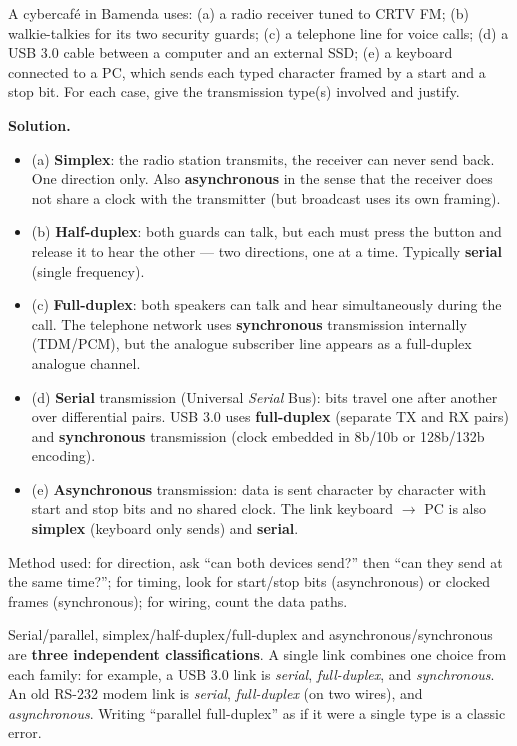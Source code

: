 \documentclass[11pt]{article}
\begin{document}
\begin{exoresolu}
A cybercaf\'e in Bamenda uses: (a) a radio receiver tuned to CRTV FM; (b) walkie-talkies for its two security guards; (c) a telephone line for voice calls; (d) a USB 3.0 cable between a computer and an external SSD; (e) a keyboard connected to a PC, which sends each typed character framed by a start and a stop bit. For each case, give the transmission type(s) involved and justify.

\tcblower
\textbf{Solution.}
\begin{itemize}
\item (a) \textbf{Simplex}: the radio station transmits, the receiver can never send back. One direction only. Also \textbf{asynchronous} in the sense that the receiver does not share a clock with the transmitter (but broadcast uses its own framing).
\item (b) \textbf{Half-duplex}: both guards can talk, but each must press the button and release it to hear the other --- two directions, one at a time. Typically \textbf{serial} (single frequency).
\item (c) \textbf{Full-duplex}: both speakers can talk and hear simultaneously during the call. The telephone network uses \textbf{synchronous} transmission internally (TDM/PCM), but the analogue subscriber line appears as a full-duplex analogue channel.
\item (d) \textbf{Serial} transmission (Universal \emph{Serial} Bus): bits travel one after another over differential pairs. USB 3.0 uses \textbf{full-duplex} (separate TX and RX pairs) and \textbf{synchronous} transmission (clock embedded in 8b/10b or 128b/132b encoding).
\item (e) \textbf{Asynchronous} transmission: data is sent character by character with start and stop bits and no shared clock. The link keyboard $\to$ PC is also \textbf{simplex} (keyboard only sends) and \textbf{serial}.
\end{itemize}
Method used: for direction, ask ``can both devices send?'' then ``can they send at the same time?''; for timing, look for start/stop bits (asynchronous) or clocked frames (synchronous); for wiring, count the data paths.
\end{exoresolu}

\begin{attention}
Serial/parallel, simplex/half-duplex/full-duplex and asynchronous/synchronous are \textbf{three independent classifications}. A single link combines one choice from each family: for example, a USB 3.0 link is \emph{serial}, \emph{full-duplex}, and \emph{synchronous}. An old RS-232 modem link is \emph{serial}, \emph{full-duplex} (on two wires), and \emph{asynchronous}. Writing ``parallel full-duplex'' as if it were a single type is a classic error.
\end{attention}
\end{document}
